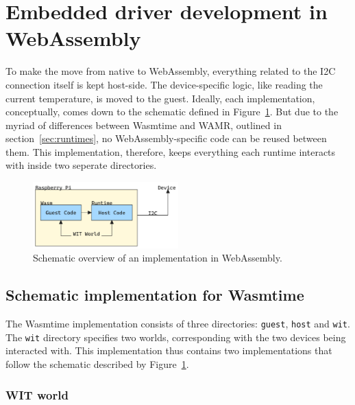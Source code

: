 \section{Embedded driver development in WebAssembly}

To make the move from native to WebAssembly, everything related to the I2C connection itself is kept host-side. The device-specific logic, like reading the current temperature, is moved to the guest. Ideally, each implementation, conceptually, comes down to the schematic defined in Figure~\ref{fig:schematic}. But due to the myriad of differences between Wasmtime and WAMR, outlined in section~\ref{sec:runtimes}, no WebAssembly-specific code can be reused between them. This implementation, therefore, keeps everything each runtime interacts with inside two seperate directories.

\begin{figure}[ht]
    \centering
    \includegraphics[width=0.5\textwidth]{figures/schema.png}
    \caption{Schematic overview of an implementation in WebAssembly.}
    \label{fig:schematic}
\end{figure}

\subsection{Schematic implementation for Wasmtime}

The Wasmtime implementation consists of three directories: \texttt{guest}, \texttt{host} and \texttt{wit}. The \texttt{wit} directory specifies two worlds, corresponding with the two devices being interacted with. This implementation thus contains two implementations that follow the schematic described by Figure~\ref{fig:schematic}.


\subsubsection{WIT world}

